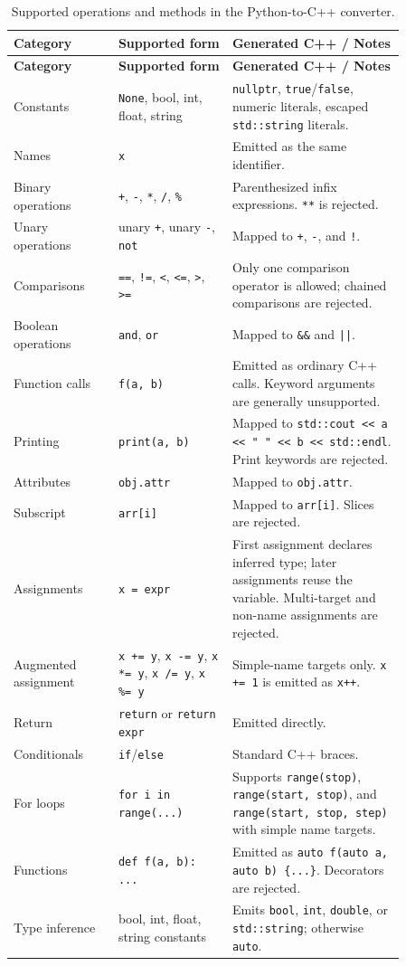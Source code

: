 \documentclass[11pt,a4paper]{article}
\begin{document}
\begin{longtable}{p{0.23\linewidth}p{0.25\linewidth}p{0.38\linewidth}}
\caption{Supported operations and methods in the Python-to-C++ converter.}\\
\toprule
\textbf{Category} & \textbf{Supported form} & \textbf{Generated C++ / Notes}\\
\midrule
\endfirsthead
\toprule
\textbf{Category} & \textbf{Supported form} & \textbf{Generated C++ / Notes}\\
\midrule
\endhead
Constants & \texttt{None}, bool, int, float, string &
\texttt{nullptr}, \texttt{true}/\texttt{false}, numeric literals, escaped
\texttt{std::string} literals.\\
Names & \texttt{x} & Emitted as the same identifier.\\
Binary operations & \texttt{+}, \texttt{-}, \texttt{*}, \texttt{/},
\texttt{\%} & Parenthesized infix expressions. \texttt{**} is rejected.\\
Unary operations & unary \texttt{+}, unary \texttt{-}, \texttt{not} &
Mapped to \texttt{+}, \texttt{-}, and \texttt{!}.\\
Comparisons & \texttt{==}, \texttt{!=}, \texttt{<}, \texttt{<=},
\texttt{>}, \texttt{>=} & Only one comparison operator is allowed; chained
comparisons are rejected.\\
Boolean operations & \texttt{and}, \texttt{or} & Mapped to \texttt{\&\&} and
\texttt{||}.\\
Function calls & \texttt{f(a, b)} & Emitted as ordinary C++ calls. Keyword
arguments are generally unsupported.\\
Printing & \texttt{print(a, b)} & Mapped to \texttt{std::cout << a << " " << b
<< std::endl}. Print keywords are rejected.\\
Attributes & \texttt{obj.attr} & Mapped to \texttt{obj.attr}.\\
Subscript & \texttt{arr[i]} & Mapped to \texttt{arr[i]}. Slices are rejected.\\
Assignments & \texttt{x = expr} & First assignment declares inferred type;
later assignments reuse the variable. Multi-target and non-name assignments
are rejected.\\
Augmented assignment & \texttt{x += y}, \texttt{x -= y}, \texttt{x *= y},
\texttt{x /= y}, \texttt{x \%= y} & Simple-name targets only. \texttt{x += 1}
is emitted as \texttt{x++}.\\
Return & \texttt{return} or \texttt{return expr} & Emitted directly.\\
Conditionals & \texttt{if}/\texttt{else} & Standard C++ braces.\\
For loops & \texttt{for i in range(...)} & Supports \texttt{range(stop)},
\texttt{range(start, stop)}, and \texttt{range(start, stop, step)} with simple
name targets.\\
Functions & \texttt{def f(a, b): ...} & Emitted as \texttt{auto f(auto a, auto
b) \{...\}}. Decorators are rejected.\\
Type inference & bool, int, float, string constants & Emits \texttt{bool},
\texttt{int}, \texttt{double}, or \texttt{std::string}; otherwise
\texttt{auto}.\\
\bottomrule
\end{longtable}
\end{document}

